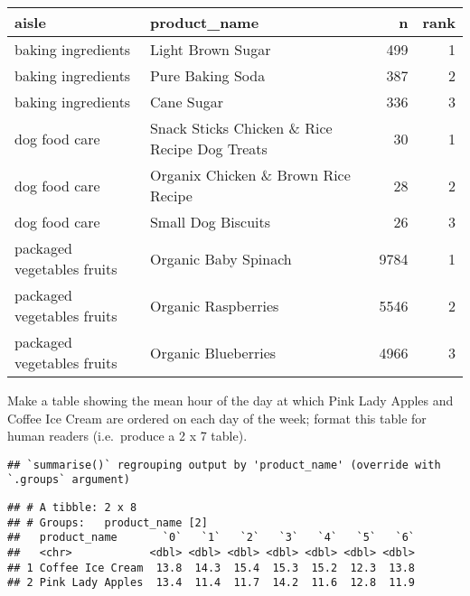 \documentclass[]{article}
\newenvironment{Shaded}{\begin{snugshade}}{\end{snugshade}}
\newcommand{\DataTypeTok}[1]{\textcolor[rgb]{0.13,0.29,0.53}{#1}}
\newcommand{\KeywordTok}[1]{\textcolor[rgb]{0.13,0.29,0.53}{\textbf{#1}}}
\newcommand{\NormalTok}[1]{#1}
\newcommand{\OperatorTok}[1]{\textcolor[rgb]{0.81,0.36,0.00}{\textbf{#1}}}
\newcommand{\StringTok}[1]{\textcolor[rgb]{0.31,0.60,0.02}{#1}}
\begin{document}
\begin{longtable}[]{@{}llrr@{}}
\toprule
aisle & product\_name & n & rank\tabularnewline
\midrule
\endhead
baking ingredients & Light Brown Sugar & 499 & 1\tabularnewline
baking ingredients & Pure Baking Soda & 387 & 2\tabularnewline
baking ingredients & Cane Sugar & 336 & 3\tabularnewline
dog food care & Snack Sticks Chicken \& Rice Recipe Dog Treats & 30 &
1\tabularnewline
dog food care & Organix Chicken \& Brown Rice Recipe & 28 &
2\tabularnewline
dog food care & Small Dog Biscuits & 26 & 3\tabularnewline
packaged vegetables fruits & Organic Baby Spinach & 9784 &
1\tabularnewline
packaged vegetables fruits & Organic Raspberries & 5546 &
2\tabularnewline
packaged vegetables fruits & Organic Blueberries & 4966 &
3\tabularnewline
\bottomrule
\end{longtable}

Make a table showing the mean hour of the day at which Pink Lady Apples
and Coffee Ice Cream are ordered on each day of the week; format this
table for human readers (i.e.~produce a 2 x 7 table).

\begin{Shaded}
\end{Shaded}

\begin{verbatim}
## `summarise()` regrouping output by 'product_name' (override with `.groups` argument)
\end{verbatim}

\begin{verbatim}
## # A tibble: 2 x 8
## # Groups:   product_name [2]
##   product_name       `0`   `1`   `2`   `3`   `4`   `5`   `6`
##   <chr>            <dbl> <dbl> <dbl> <dbl> <dbl> <dbl> <dbl>
## 1 Coffee Ice Cream  13.8  14.3  15.4  15.3  15.2  12.3  13.8
## 2 Pink Lady Apples  13.4  11.4  11.7  14.2  11.6  12.8  11.9
\end{verbatim}
\end{document}
